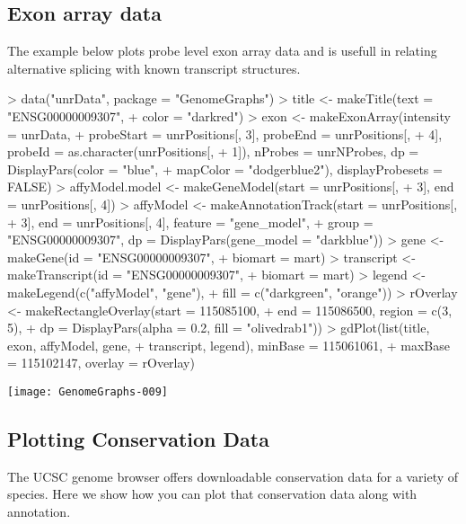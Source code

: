 \documentclass[11pt]{article}
\begin{document}
\subsection{Exon array data}

The example below plots probe level exon array data and is usefull in
relating alternative splicing with known transcript structures.

\begin{Schunk}
\begin{Sinput}
> data("unrData", package = "GenomeGraphs")
> title <- makeTitle(text = "ENSG00000009307", 
+     color = "darkred")
> exon <- makeExonArray(intensity = unrData, 
+     probeStart = unrPositions[, 3], probeEnd = unrPositions[, 
+         4], probeId = as.character(unrPositions[, 
+         1]), nProbes = unrNProbes, dp = DisplayPars(color = "blue", 
+         mapColor = "dodgerblue2"), displayProbesets = FALSE)
> affyModel.model <- makeGeneModel(start = unrPositions[, 
+     3], end = unrPositions[, 4])
> affyModel <- makeAnnotationTrack(start = unrPositions[, 
+     3], end = unrPositions[, 4], feature = "gene_model", 
+     group = "ENSG00000009307", dp = DisplayPars(gene_model = "darkblue"))
> gene <- makeGene(id = "ENSG00000009307", 
+     biomart = mart)
> transcript <- makeTranscript(id = "ENSG00000009307", 
+     biomart = mart)
> legend <- makeLegend(c("affyModel", "gene"), 
+     fill = c("darkgreen", "orange"))
> rOverlay <- makeRectangleOverlay(start = 115085100, 
+     end = 115086500, region = c(3, 5), 
+     dp = DisplayPars(alpha = 0.2, fill = "olivedrab1"))
> gdPlot(list(title, exon, affyModel, gene, 
+     transcript, legend), minBase = 115061061, 
+     maxBase = 115102147, overlay = rOverlay)
\end{Sinput}
\end{Schunk}
\texttt{[image: GenomeGraphs-009]}

\subsection{Plotting Conservation Data}
The UCSC genome browser offers downloadable conservation data for a
variety of species. Here we show how you can plot that conservation
data along with annotation. 
\end{document}
